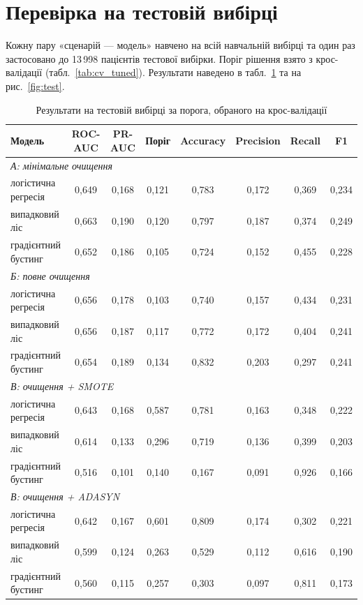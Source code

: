 \documentclass[14pt,a4paper]{extreport}
\begin{document}
\section{Перевірка на тестовій вибірці}
\label{sec:test}

Кожну пару «сценарій --- модель» навчено на всій навчальній вибірці та один раз застосовано до 13\,998 пацієнтів тестової вибірки. Поріг рішення взято з крос-валідації (табл.~\ref{tab:cv_tuned}). Результати наведено в табл.~\ref{tab:test} та на рис.~\ref{fig:test}.

\begin{table}[H]
\caption{Результати на тестовій вибірці за порога, обраного на крос-валідації}
\label{tab:test}
\footnotesize
\renewcommand{\arraystretch}{1.15}
\setlength{\tabcolsep}{4pt}
\begin{tabularx}{\linewidth}{|X|c|c|c|c|c|c|c|}
\hline
\textbf{Модель} & \textbf{ROC-AUC} & \textbf{PR-AUC} & \textbf{Поріг} & \textbf{Accuracy} & \textbf{Precision} & \textbf{Recall} & \textbf{F1} \\
\hline
\multicolumn{8}{|l|}{\textit{А: мінімальне очищення}} \\
\hline
логістична регресія & 0,649 & 0,168 & 0,121 & 0,783 & 0,172 & 0,369 & 0,234 \\
\hline
випадковий ліс & 0,663 & 0,190 & 0,120 & 0,797 & 0,187 & 0,374 & 0,249 \\
\hline
градієнтний бустинг & 0,652 & 0,186 & 0,105 & 0,724 & 0,152 & 0,455 & 0,228 \\
\hline
\multicolumn{8}{|l|}{\textit{Б: повне очищення}} \\
\hline
логістична регресія & 0,656 & 0,178 & 0,103 & 0,740 & 0,157 & 0,434 & 0,231 \\
\hline
випадковий ліс & 0,656 & 0,187 & 0,117 & 0,772 & 0,172 & 0,404 & 0,241 \\
\hline
градієнтний бустинг & 0,654 & 0,189 & 0,134 & 0,832 & 0,203 & 0,297 & 0,241 \\
\hline
\multicolumn{8}{|l|}{\textit{В: очищення + SMOTE}} \\
\hline
логістична регресія & 0,643 & 0,168 & 0,587 & 0,781 & 0,163 & 0,348 & 0,222 \\
\hline
випадковий ліс & 0,614 & 0,133 & 0,296 & 0,719 & 0,136 & 0,399 & 0,203 \\
\hline
градієнтний бустинг & 0,516 & 0,101 & 0,140 & 0,167 & 0,091 & 0,926 & 0,166 \\
\hline
\multicolumn{8}{|l|}{\textit{В: очищення + ADASYN}} \\
\hline
логістична регресія & 0,642 & 0,167 & 0,601 & 0,809 & 0,174 & 0,302 & 0,221 \\
\hline
випадковий ліс & 0,599 & 0,124 & 0,263 & 0,529 & 0,112 & 0,616 & 0,190 \\
\hline
градієнтний бустинг & 0,560 & 0,115 & 0,257 & 0,303 & 0,097 & 0,811 & 0,173 \\
\hline
\end{tabularx}
\end{table}
\end{document}
